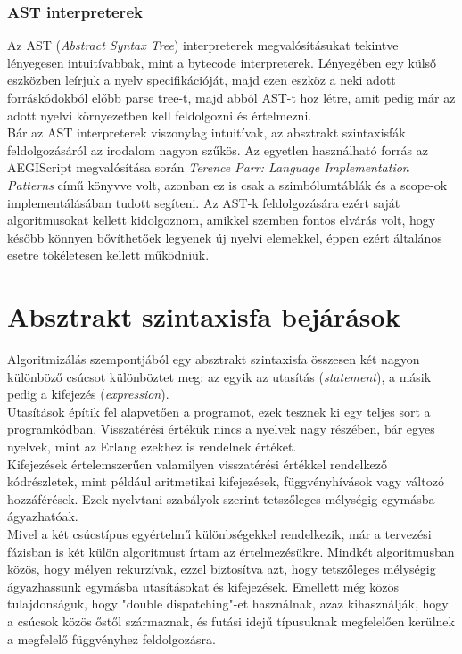 \documentclass[a4paper,12pt]{report}
\begin{document}

\subsubsection{AST interpreterek}

Az AST (\textit{Abstract Syntax Tree}) interpreterek megvalósításukat tekintve lényegesen intuitívabbak, mint a bytecode interpreterek. Lényegében egy külső eszközben leírjuk a nyelv specifikációját, majd ezen eszköz a neki adott forráskódokból előbb parse tree-t, majd abból AST-t hoz létre, amit pedig már az adott nyelvi környezetben kell feldolgozni és értelmezni.\\
Bár az AST interpreterek viszonylag intuitívak, az absztrakt szintaxisfák feldolgozásáról az irodalom nagyon szűkös. Az egyetlen használható forrás az AEGIScript megvalósítása során \textit{Terence Parr: Language Implementation Patterns}\cite{lip} című könyvve volt, azonban ez is csak a szimbólumtáblák és a scope-ok implementálásában tudott segíteni. Az AST-k feldolgozására ezért saját algoritmusokat kellett kidolgoznom, amikkel szemben fontos elvárás volt, hogy később könnyen bővíthetőek legyenek új nyelvi elemekkel, éppen ezért általános esetre tökéletesen kellett működniük.


\section{Absztrakt szintaxisfa bejárások}
Algoritmizálás szempontjából egy absztrakt szintaxisfa összesen két nagyon különböző csúcsot különböztet meg: az egyik az utasítás (\textit{statement}), a másik pedig a kifejezés (\textit{expression}).
\\
Utasítások építik fel alapvetően a programot, ezek tesznek ki egy teljes sort a programkódban. Visszatérési értékük nincs a nyelvek nagy részében, bár egyes nyelvek, mint az Erlang ezekhez is rendelnek értéket.
\\
Kifejezések értelemszerűen valamilyen visszatérési értékkel rendelkező kódrészletek, mint például aritmetikai kifejezések, függvényhívások vagy változó hozzáférések. Ezek nyelvtani szabályok szerint tetszőleges mélységig egymásba ágyazhatóak.
\\
Mivel a két csúcstípus egyértelmű különbségekkel rendelkezik, már a tervezési fázisban is két külön algoritmust írtam az értelmezésükre. Mindkét algoritmusban közös, hogy mélyen rekurzívak, ezzel biztosítva azt, hogy tetszőleges mélységig ágyazhassunk egymásba utasításokat és kifejezések. Emellett még közös tulajdonságuk, hogy "double dispatching"-et használnak, azaz kihasználják, hogy a csúcsok közös őstől származnak, és futási idejű típusuknak megfelelően kerülnek a megfelelő függvényhez feldolgozásra.
\end{document}
